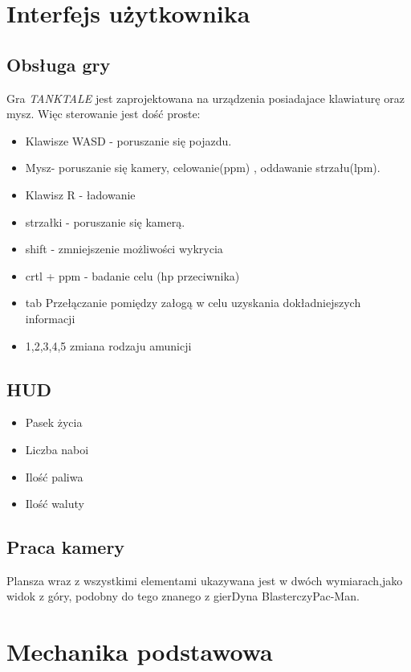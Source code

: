 \documentclass{article}
\begin{document}
\section{Interfejs użytkownika}
    \subsection{Obsługa gry}
Gra \emph{TANKTALE} jest zaprojektowana na urządzenia posiadajace klawiaturę oraz mysz. Więc sterowanie jest dość proste:
\begin{itemize}
    \item Klawisze WASD - poruszanie się pojazdu.
    \item Mysz- poruszanie się kamery, celowanie(ppm) , oddawanie strzału(lpm).
    \item Klawisz R - ładowanie
    \item strzałki - poruszanie się kamerą.
    \item shift - zmniejszenie możliwości wykrycia
    \item crtl + ppm - badanie celu (hp przeciwnika)
    \item tab Przełączanie pomiędzy załogą w celu uzyskania dokładniejszych informacji
    \item 1,2,3,4,5 zmiana rodzaju amunicji
    
\end{itemize}
    \subsection{HUD}
    
    \begin{itemize}
    \item Pasek życia
    \item Liczba naboi
    \item Ilość paliwa
    \item Ilość waluty
    
    
\end{itemize}
    
    \subsection{Praca kamery}
    Plansza  wraz  z  wszystkimi  elementami  ukazywana  jest  w  dwóch  wymiarach,jako  widok  z  góry,  podobny  do  tego  znanego  z  gierDyna  BlasterczyPac-Man.
    \newpage
    
\section{Mechanika podstawowa}
\end{document}
